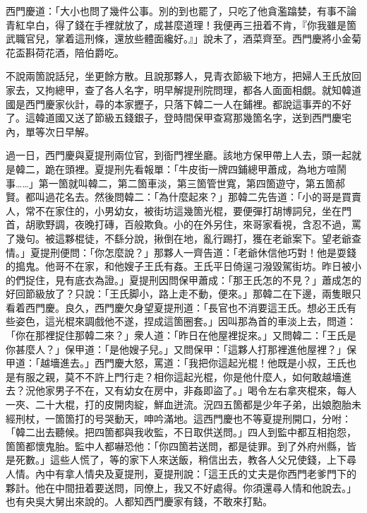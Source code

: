 西門慶道：「大小也問了幾件公事。別的到也罷了，只吃了他貪濫蹹婪，有事不論青紅皁白，得了錢在手裡就放了，{}成甚麼道理！我便再三扭着不肯，『你我雖是箇武職官兒，掌着這刑條，還放些體面纔好。』」說未了，酒菜齊至。西門慶將小金菊花盃斟荷花酒，陪伯爵吃。

不說兩箇說話兒，坐更餘方散。且說那夥人，見青衣節級下地方，把婦人王氏放回家去，又拘總甲，查了各人名字，明早解提刑院問理，都各人面面相覷。{}就知韓道國是西門慶家伙計，尋的本家攊子，只落下韓二一人在鋪裡。都說這事弄的不好了。這韓道國又送了節級五錢銀子，登時間保甲查寫那幾箇名字，送到西門慶宅內，單等次日早解。

過一日，西門慶與夏提刑兩位官，到衙門裡坐廳。該地方保甲帶上人去，頭一起就是韓二，跪在頭裡。夏提刑先看報單：「牛皮街一牌四鋪總甲蕭成，為地方喧鬧事……」第一箇就叫韓二，第二箇車淡，第三箇管世寬，第四箇遊守，第五箇郝賢。都叫過花名去。然後問韓二：「為什麼起來？」那韓二先告道：「小的哥是買賣人，常不在家住的，小男幼女，被街坊這幾箇光棍，要便彈打胡博詞兒，坐在門首，胡歌野調，夜晚打磚，百般欺負。小的在外另住，來哥家看視，含忍不過，罵了幾句。被這夥棍徒，不繇分說，揪倒在地，亂行踢打，獲在老爺案下。望老爺查情。」夏提刑便問：「你怎麼說？」那夥人一齊告道：「老爺休信他巧對！他是耍錢的搗鬼。他哥不在家，和他嫂子王氏有姦。王氏平日倚逞刁潑毀駕街坊。昨日被小的們捉住，見有底衣為證。」夏提刑因問保甲蕭成：「那王氏怎的不見？」蕭成怎的好回節級放了？只說：「王氏脚小，路上走不動，便來。」那韓二在下邊，兩隻眼只看着西門慶。良久，西門慶欠身望夏提刑道：「長官也不消要這王氏。想必王氏有些姿色，這光棍來調戲他不遂，捏成這箇圈套。」{}因叫那為首的車淡上去，問道：「你在那裡捉住那韓二來？」衆人道：「昨日在他屋裡捉來。」又問韓二：「王氏是你甚麼人？」保甲道：「是他嫂子兒。」又問保甲：「這夥人打那裡進他屋裡？」保甲道：「越墻進去。」西門慶大怒，罵道：「我把你這起光棍！他既是小叔，王氏也是有服之親，莫不不許上門行走？相你這起光棍，你是他什麼人，如何敢越墻進去？況他家男子不在，又有幼女在房中，非姦即盜了。」{}喝令左右拿夾棍來，每人一夾、二十大棍，打的皮開肉綻，鮮血迸流。況四五箇都是少年子弟，出娘胞胎未經刑杖，一箇箇打的号哭動天，呻吟滿地。這西門慶也不等夏提刑開口，分咐：「韓二出去聽候。把四箇都與我收監，不日取供送問。」四人到監中都互相抱怨，箇箇都懷鬼胎。監中人都嚇恐他：「你四箇若送問，都是徒罪。到了外府州縣，皆是死數。」這些人慌了，等的家下人來送飯，稍信出去，教各人父兄使錢，上下尋人情。內中有拿人情央及夏提刑，夏提刑說：「這王氏的丈夫是你西門老爹門下的夥計。他在中間扭着要送問，同僚上，我又不好處得。你須還尋人情和他說去。」也有央吳大舅出來說的。人都知西門慶家有錢，不敢來打點。

